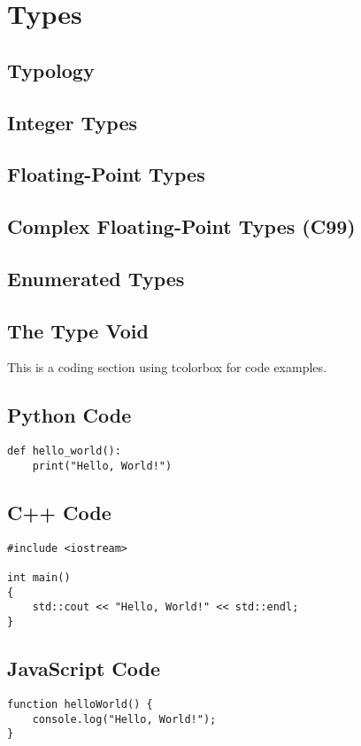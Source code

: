 \section{Types}

\subsection{Typology}
\subsection{Integer Types}
\subsection{Floating-Point Types}
\subsection{Complex Floating-Point Types (C99)}
\subsection{Enumerated Types}
\subsection{The Type Void}


This is a coding section using tcolorbox for code examples.

\subsection{Python Code}
\begin{tcolorbox}[title=Python Code Example]
\begin{verbatim}
def hello_world():
    print("Hello, World!")
\end{verbatim}
\end{tcolorbox}

\subsection{C++ Code}
\begin{tcolorbox}[title=C++ Code Example]
\begin{verbatim}
#include <iostream>

int main()
{
    std::cout << "Hello, World!" << std::endl;
}
\end{verbatim}
\end{tcolorbox}

\subsection{JavaScript Code}
\begin{tcolorbox}[title=JavaScript Code Example]
\begin{verbatim}
function helloWorld() {
    console.log("Hello, World!");
}
\end{verbatim}
\end{tcolorbox}
